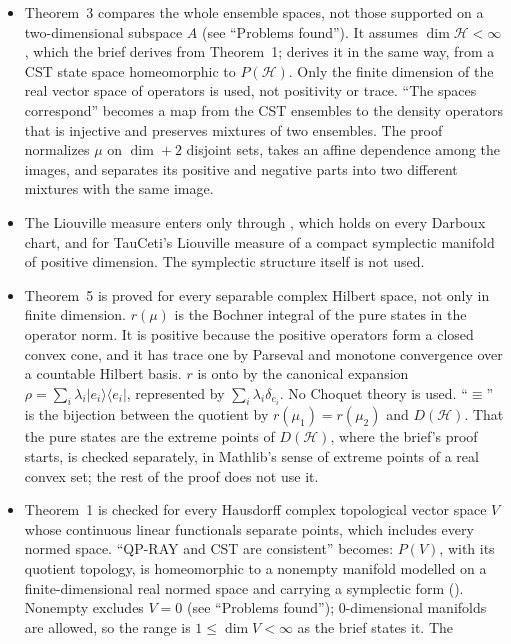 \documentclass[11pt]{article}
\begin{document}
\begin{itemize}
\item Theorem~3 compares the whole ensemble spaces, not those supported on a two-dimensional
  subspace $A$ (see ``Problems found''). It assumes $\dim\mathcal H < \infty$, which the brief
  derives from Theorem~1;  derives it in the same way,
  from a CST state space homeomorphic to $P(\mathcal H)$. Only the finite dimension of the real vector space of operators is
  used, not positivity or trace. ``The spaces correspond'' becomes a map from the CST ensembles to
  the density operators that is injective and preserves mixtures of two ensembles. The proof
  normalizes $\mu$ on $\dim + 2$ disjoint sets, takes an affine dependence among the images, and
  separates its positive and negative parts into two different mixtures with the same image.
\item The Liouville measure enters only through , which holds on every
  Darboux chart, and for TauCeti's Liouville measure of a compact symplectic manifold of positive
  dimension. The symplectic structure itself is not used.
\item Theorem~5 is proved for every separable complex Hilbert space, not only in finite dimension.
  $r(\mu)$ is the Bochner integral of the pure states in the operator norm. It is positive because
  the positive operators form a closed convex cone, and it has trace one by Parseval and monotone
  convergence over a countable Hilbert basis. $r$ is onto by the canonical expansion
  $\rho = \sum_i\lambda_i|e_i\rangle\langle e_i|$, represented by $\sum_i\lambda_i\delta_{e_i}$.
  No Choquet theory is used. ``$\equiv$'' is the bijection between the quotient by
  $r(\mu_1) = r(\mu_2)$ and $D(\mathcal H)$. That the pure states are the extreme points of
  $D(\mathcal H)$, where the brief's proof starts, is checked separately, in Mathlib's sense of
  extreme points of a real convex set; the rest of the proof does not use it.
\item Theorem~1 is checked for every Hausdorff complex topological vector space $V$ whose
  continuous linear functionals separate points, which includes every normed space. ``QP-RAY and
  CST are consistent'' becomes: $P(V)$, with its quotient topology, is homeomorphic to a nonempty
  manifold modelled on a finite-dimensional real normed space and carrying a symplectic form
  (). Nonempty excludes $V = 0$ (see ``Problems found''); $0$-dimensional
  manifolds are allowed, so the range is $1 \le \dim V < \infty$ as the brief states it. The

\end{itemize}
\end{document}
